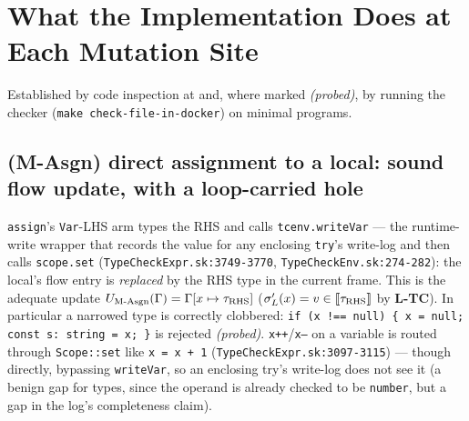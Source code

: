 \documentclass[11pt]{article}
\newcommand{\Env}{\Gamma}
\begin{document}
\section{What the Implementation Does at Each Mutation Site}
\label{sec:sites}

Established by code inspection at \texttt{\skjspinhash} and, where marked
\emph{(probed)}, by running the checker (\texttt{make
check-file-in-docker}) on minimal programs.

\subsection{(M-Asgn) direct assignment to a local: sound flow update,
with a loop-carried hole}
\label{sec:masgn-direct}
\texttt{assign}'s \texttt{Var}-LHS arm types the RHS and calls
\texttt{tcenv.writeVar} — the runtime-write wrapper that records the
value for any enclosing \texttt{try}'s write-log and then calls
\texttt{scope.set} (\texttt{TypeCheckExpr.sk:3749-3770},
\texttt{TypeCheckEnv.sk:274-282}): the local's flow entry is
\emph{replaced} by the RHS type in the current frame. This is the
adequate update $U_{\text{M-Asgn}}(\Env) = \Env[x \mapsto \tau_{\rm RHS}]$
($\sigma'_L(x) = v \in \llbracket \tau_{\rm RHS} \rrbracket$ by \textbf{L-TC}). In
particular a narrowed type is correctly clobbered: \texttt{if (x !== null)
\{ x = null; const s: string = x; \}} is rejected \emph{(probed)}.
\texttt{x++}/\texttt{x--} on a variable is routed through
\texttt{Scope::set} like \texttt{x = x + 1}
(\texttt{TypeCheckExpr.sk:3097-3115}) — though directly, bypassing
\texttt{writeVar}, so an enclosing try's write-log does not see it (a
benign gap for types, since the operand is already checked to be
\texttt{number}, but a gap in the log's completeness claim).
\end{document}
